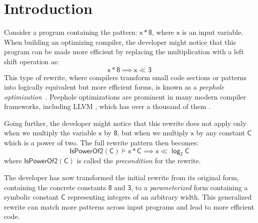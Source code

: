 \documentclass[review, anonymous, acmsmall]{acmart}
\newcommand{\blockmath}[1]{\[\mathsf{#1}\]}
\newcommand{\inline}[1]{$\mathsf{#1}$}
\begin{document}

\fi

\maketitle

\section{Introduction}

Consider a program containing the pattern: \inline{x * 8}, where \inline{x} is an input variable. When building an optimizing compiler, the developer might notice that this program can be made more efficient by replacing the multiplication with a left shift operation as:
\[\mathsf{x * 8  \implies x \ll 3}\]
This type of rewrite, where compilers transform small code sections or patterns into logically equivalent but more efficient forms, is known as a \textit{peephole optimization}~\cite{mckeeman_peephole_1965}. Peephole optimizations are prominent in many modern compiler frameworks, including LLVM \cite{lattner_llvm_2004}, which has over a thousand of them \cite{menendez_termination-checking_2016}.

Going further, the developer might notice that this rewrite does not apply only when we multiply the variable \inline{x} by \inline{8}, but when we multiply \inline{x} by any constant \inline{C} which is a power of two. The full rewrite pattern then becomes:
    \blockmath{IsPowerOf2(C) \models x * C \implies x \ll \log_2 C}
where $\mathsf{IsPowerOf2(C)}$ is called the \textit{precondition} for the rewrite.

The developer has now transformed the initial rewrite from its original form,
containing the concrete constants \inline{8} and \inline{3}, to a \textit{parameterized} form containing a symbolic constant \inline{C} representing integers of an arbitrary width.
This generalized rewrite can match more patterns across input programs and lead to more efficient code.
\end{document}
